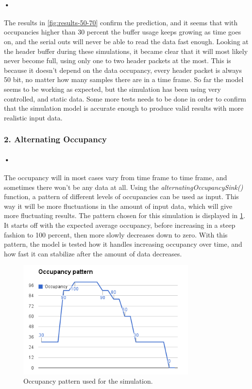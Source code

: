 \documentclass[a4paper, 12pt, openright, twoside]{report}
\begin{document}
\paragraph{•} %
The results in \ref{fig:results-50-70} confirm the prediction, and it seems that with occupancies higher than 30 percent the buffer usage keeps growing as time goes on, and the serial outs will never be able to read the data fast enough.
Looking at the header buffer during these simulations, it became clear that it will most likely never become full, using only one to two header packets at the most.
This is because it doesn't depend on the data occupancy, every header packet is always 50 bit, no matter how many samples there are in a time frame.
So far the model seems to be working as expected, but the simulation has been using very controlled, and static data.
Some more tests needs to be done in order to confirm that the simulation model is accurate enough to produce valid results with more realistic input data.

\subsubsection{2. Alternating Occupancy}

\paragraph{•} %
The occupancy will in most cases vary from time frame to time frame, and sometimes there won't be any data at all.
Using the \textit{alternatingOccupancySink()} function, a pattern of different levels of occupancies can be used as input.
This way it will be more fluctuations in the amount of input data, which will give more fluctuating results.
The pattern chosen for this simulation is displayed in \ref{fig:occ-pattern}.
It starts off with the expected average occupancy, before increasing in a steep fashion to 100 percent, then more slowly decreases down to zero.
With this pattern, the model is tested how it handles increasing occupancy over time, and how fast it can stabilize after the amount of data decreases.

\begin{figure}[h!]
	\centering
		\includegraphics[width=0.8\textwidth]{images/occ-pattern.png}
		\caption{Occupancy pattern used for the simulation.}
		\label{fig:occ-pattern}
\end{figure}
\end{document}
